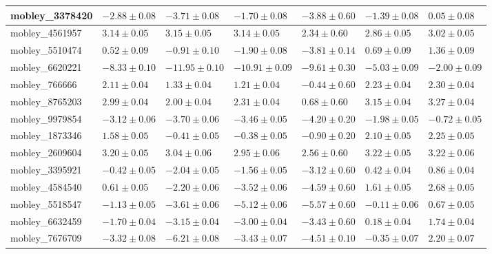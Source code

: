 \documentclass{article}
\begin{document}
\begin{landscape}
\begin{longtable}{|l{3.0cm}|l{3.0cm}|l{3.2cm}|l{3.6cm}|l{3.0cm}|l{3.0cm}|l{3.0cm}|}
mobley\_3378420	&	$	-2.88	\pm	0.08	$	&	$	-3.71	\pm	0.08	$	&	$	-1.70	\pm	0.08	$	&	$	-3.88	\pm	0.60	$	&	$	-1.39	\pm	0.08	$	&	$	0.05	\pm	0.08	$	\\ \hline
mobley\_4561957	&	$	3.14	\pm	0.05	$	&	$	3.15	\pm	0.05	$	&	$	3.14	\pm	0.05	$	&	$	2.34	\pm	0.60	$	&	$	2.86	\pm	0.05	$	&	$	3.02	\pm	0.05	$	\\ \hline
mobley\_5510474	&	$	0.52	\pm	0.09	$	&	$	-0.91	\pm	0.10	$	&	$	-1.90	\pm	0.08	$	&	$	-3.81	\pm	0.14	$	&	$	0.69	\pm	0.09	$	&	$	1.36	\pm	0.09	$	\\ \hline
mobley\_6620221	&	$	-8.33	\pm	0.10	$	&	$	-11.95	\pm	0.10	$	&	$	-10.91	\pm	0.09	$	&	$	-9.61	\pm	0.30	$	&	$	-5.03	\pm	0.09	$	&	$	-2.00	\pm	0.09	$	\\ \hline
mobley\_766666	&	$	2.11	\pm	0.04	$	&	$	1.33	\pm	0.04	$	&	$	1.21	\pm	0.04	$	&	$	-0.44	\pm	0.60	$	&	$	2.23	\pm	0.04	$	&	$	2.30	\pm	0.04	$	\\ \hline
mobley\_8765203	&	$	2.99	\pm	0.04	$	&	$	2.00	\pm	0.04	$	&	$	2.31	\pm	0.04	$	&	$	0.68	\pm	0.60	$	&	$	3.15	\pm	0.04	$	&	$	3.27	\pm	0.04	$	\\ \hline
mobley\_9979854	&	$	-3.12	\pm	0.06	$	&	$	-3.70	\pm	0.06	$	&	$	-3.46	\pm	0.05	$	&	$	-4.20	\pm	0.20	$	&	$	-1.98	\pm	0.05	$	&	$	-0.72	\pm	0.05	$	\\ \hline
mobley\_1873346	&	$	1.58	\pm	0.05	$	&	$	-0.41	\pm	0.05	$	&	$	-0.38	\pm	0.05	$	&	$	-0.90	\pm	0.20	$	&	$	2.10	\pm	0.05	$	&	$	2.25	\pm	0.05	$	\\ \hline
mobley\_2609604	&	$	3.20	\pm	0.05	$	&	$	3.04	\pm	0.06	$	&	$	2.95	\pm	0.06	$	&	$	2.56	\pm	0.60	$	&	$	3.22	\pm	0.05	$	&	$	3.22	\pm	0.06	$	\\ \hline
mobley\_3395921	&	$	-0.42	\pm	0.05	$	&	$	-2.04	\pm	0.05	$	&	$	-1.56	\pm	0.05	$	&	$	-3.12	\pm	0.60	$	&	$	0.42	\pm	0.04	$	&	$	0.86	\pm	0.04	$	\\ \hline
mobley\_4584540	&	$	0.61	\pm	0.05	$	&	$	-2.20	\pm	0.06	$	&	$	-3.52	\pm	0.06	$	&	$	-4.59	\pm	0.60	$	&	$	1.61	\pm	0.05	$	&	$	2.68	\pm	0.05	$	\\ \hline
mobley\_5518547	&	$	-1.13	\pm	0.05	$	&	$	-3.61	\pm	0.06	$	&	$	-5.12	\pm	0.06	$	&	$	-5.57	\pm	0.60	$	&	$	-0.11	\pm	0.06	$	&	$	0.67	\pm	0.05	$	\\ \hline
mobley\_6632459	&	$	-1.70	\pm	0.04	$	&	$	-3.15	\pm	0.04	$	&	$	-3.00	\pm	0.04	$	&	$	-3.43	\pm	0.60	$	&	$	0.18	\pm	0.04	$	&	$	1.74	\pm	0.04	$	\\ \hline
mobley\_7676709	&	$	-3.32	\pm	0.08	$	&	$	-6.21	\pm	0.08	$	&	$	-3.43	\pm	0.07	$	&	$	-4.51	\pm	0.10	$	&	$	-0.35	\pm	0.07	$	&	$	2.20	\pm	0.07	$	\\ \hline

\end{longtable}
\end{landscape}
\end{document}
